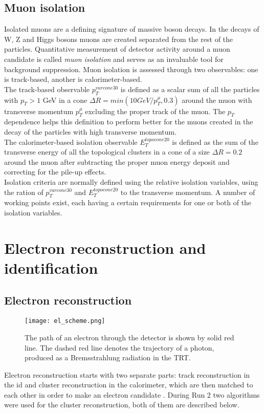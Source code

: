      \subsection{Muon isolation}   
     Isolated muons are a defining signature of massive boson decays. In the decays of W, Z and Higgs bosons muons are created separated from the rest of the particles. Quantitative measurement of detector activity around a muon candidate is called \textit{muon isolation} and serves as an invaluable tool for background suppression. Muon isolation is assessed through two observables: one is track-based, another is calorimeter-based. \\
     The track-based observable $p_T^{varcone30}$ is defined as a scalar sum of all the particles with $p_T>1$ GeV in a cone $\Delta R=min(10 GeV/p_T^{\mu},0.3)$ around the muon with transverse momentum $p_T^{\mu}$ excluding the proper track of the muon. The $p_T$ dependence helps this definition to perform better for the muons created in the decay of the particles with high transverse momentum.\\
     The calorimeter-based isolation observable $E_T^{topocone20}$ is defined as the sum of the transverse energy of all the topological clusters in a cone of a size $\Delta R = 0.2$ around the muon after subtracting the proper muon energy deposit and correcting for the pile-up effects.\\
     Isolation criteria are normally defined using the relative isolation variables, using the ration of  $p_T^{varcone30}$ and $E_T^{topocone20}$ to the transverse momentum. A number of working points exist, each having a certain requirements for one or both of the isolation variables.
     
     \section{Electron reconstruction and identification}
     \subsection{Electron reconstruction}
           \begin{figure}[htbp]
     	\centering
     	\texttt{[image: el\_scheme.png]}
     	\caption[Electron path]{The path of an electron through the detector is shown by solid red line. The dashed red line denotes the trajectory of a photon, produced as a Bremsstrahlung radiation in the TRT.}
     	\label{fig::el_id_scheme}
     \end{figure}
     Electron reconstruction starts with two separate parts: track reconstruction in the \gls{id} and cluster reconstruction in the calorimeter, which are then matched to each other in order to make an electron candidate \cite{electrons_reco1}. During Run 2 two algorithms were used for the cluster reconstruction, both of them are described below.\\
